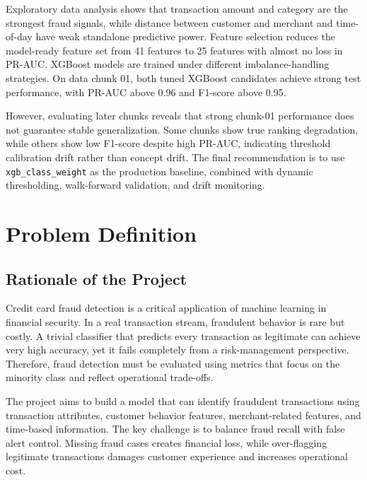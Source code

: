 \documentclass[12pt,a4paper,twoside]{article}
\begin{document}
Exploratory data analysis shows that transaction amount and category are the strongest fraud signals, while distance between customer and merchant and time-of-day have weak standalone predictive power. Feature selection reduces the model-ready feature set from 41 features to 25 features with almost no loss in PR-AUC. XGBoost models are trained under different imbalance-handling strategies. On data chunk 01, both tuned XGBoost candidates achieve strong test performance, with PR-AUC above 0.96 and F1-score above 0.95.

However, evaluating later chunks reveals that strong chunk-01 performance does not guarantee stable generalization. Some chunks show true ranking degradation, while others show low F1-score despite high PR-AUC, indicating threshold calibration drift rather than concept drift. The final recommendation is to use \texttt{xgb\_class\_weight} as the production baseline, combined with dynamic thresholding, walk-forward validation, and drift monitoring.

\newpage
{}

\section{Problem Definition}

\subsection{Rationale of the Project}

Credit card fraud detection is a critical application of machine learning in financial security. In a real transaction stream, fraudulent behavior is rare but costly. A trivial classifier that predicts every transaction as legitimate can achieve very high accuracy, yet it fails completely from a risk-management perspective. Therefore, fraud detection must be evaluated using metrics that focus on the minority class and reflect operational trade-offs.

The project aims to build a model that can identify fraudulent transactions using transaction attributes, customer behavior features, merchant-related features, and time-based information. The key challenge is to balance fraud recall with false alert control. Missing fraud cases creates financial loss, while over-flagging legitimate transactions damages customer experience and increases operational cost.
\end{document}
